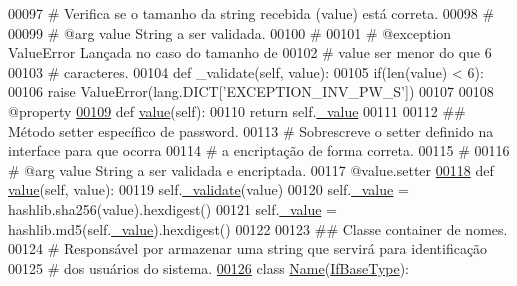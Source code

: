 \begin{DoxyCode}
00097     \textcolor{comment}{#   Verifica se o tamanho da string recebida (value) está correta.}
00098     \textcolor{comment}{#}
00099     \textcolor{comment}{#   @arg        value       String a ser validada.}
00100     \textcolor{comment}{#}
00101     \textcolor{comment}{#   @exception  ValueError  Lançada no caso do tamanho de}
00102     \textcolor{comment}{#                           value ser menor do que 6}
00103     \textcolor{comment}{#                           caracteres.}
00104     \textcolor{keyword}{def }\_validate(self, value):
00105         if(len(value) < 6):
00106             \textcolor{keywordflow}{raise} ValueError(lang.DICT[\textcolor{stringliteral}{'EXCEPTION\_INV\_PW\_S'}])
00107 
00108     @property
\hypertarget{BaseUnit_8py_source_l00109}{}\hyperlink{classELO_1_1BaseUnit_1_1Password_a6fc2a1e298a82e38701e8bf236a06d0e}{00109}     \textcolor{keyword}{def }\hyperlink{classELO_1_1BaseUnit_1_1Password_a6fc2a1e298a82e38701e8bf236a06d0e}{value}(self):
00110         \textcolor{keywordflow}{return} self.\hyperlink{classELO_1_1BaseUnit_1_1IfBaseType_ad05d9d377fc4b99743c022cc8f6019d7}{\_value}
00111 
00112     \textcolor{comment}{## Método setter específico de password.}
00113     \textcolor{comment}{#   Sobrescreve o setter definido na interface para que ocorra}
00114     \textcolor{comment}{#   a encriptação de forma correta.}
00115     \textcolor{comment}{#}
00116     \textcolor{comment}{#   @arg value String a ser validada e encriptada.}
00117     @value.setter
\hypertarget{BaseUnit_8py_source_l00118}{}\hyperlink{classELO_1_1BaseUnit_1_1Password_ad755afa2fa3666d80e5ddb046e612254}{00118}     \textcolor{keyword}{def }\hyperlink{classELO_1_1BaseUnit_1_1Password_a6fc2a1e298a82e38701e8bf236a06d0e}{value}(self, value):
00119         self.\hyperlink{classELO_1_1BaseUnit_1_1IfBaseType_acf84c5906a39b605a23ab68c4ca1dd19}{\_validate}(value)
00120         self.\hyperlink{classELO_1_1BaseUnit_1_1IfBaseType_ad05d9d377fc4b99743c022cc8f6019d7}{\_value} = hashlib.sha256(value).hexdigest()
00121         self.\hyperlink{classELO_1_1BaseUnit_1_1IfBaseType_ad05d9d377fc4b99743c022cc8f6019d7}{\_value} = hashlib.md5(self.\hyperlink{classELO_1_1BaseUnit_1_1IfBaseType_ad05d9d377fc4b99743c022cc8f6019d7}{\_value}).hexdigest()
00122 
00123 \textcolor{comment}{## Classe container de nomes.}
00124 \textcolor{comment}{#   Responsável por armazenar uma string que servirá para identificação}
00125 \textcolor{comment}{#   dos usuários do sistema.}
\hypertarget{BaseUnit_8py_source_l00126}{}\hyperlink{classELO_1_1BaseUnit_1_1Name}{00126} \textcolor{keyword}{class }\hyperlink{classELO_1_1BaseUnit_1_1Name}{Name}(\hyperlink{classELO_1_1BaseUnit_1_1IfBaseType}{IfBaseType}):

\end{DoxyCode}
